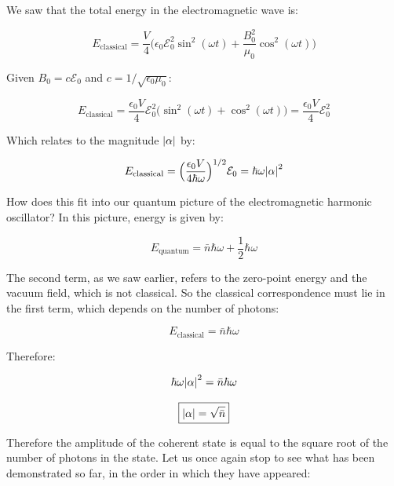 \documentclass[12pt,a4paper]{report}
\begin{document}
We saw that the total energy in the electromagnetic wave is:

\begin{equation}
    E_{\text{classical}}=\frac{V}{4}\Bigg(\epsilon_0\mathcal{E}_0^2\sin^2(\omega t)+\frac{B_0^2}{\mu_0}\cos^2(\omega t)\Bigg)
\end{equation}

Given $B_0=c\mathcal{E}_0$ and $c=1/\sqrt{\epsilon_0\mu_0}$:

\begin{equation}
    E_{\text{classical}}=\frac{\epsilon_0V}{4}\mathcal{E}_0^2\Big(\sin^2(\omega t)+\cos^2(\omega t)\Big)=\frac{\epsilon_0V}{4}\mathcal{E}_0^2
\end{equation}

Which relates to the magnitude $\abs{\alpha}$ by:

\begin{equation}
    E_{\text{classical}}=\Big( \frac{\epsilon_0V}{4\hbar\omega} \Big)^{1/2}\mathcal{E}_0=\hbar\omega\abs{\alpha}^2
\end{equation}

How does this fit into our quantum picture of the electromagnetic harmonic oscillator? In this picture, energy is given by:

\begin{equation}
    E_{\text{quantum}}=\bar{n}\hbar\omega+\frac{1}{2}\hbar\omega
\end{equation}

The second term, as we saw earlier, refers to the zero-point energy and the vacuum field, which is not classical. So the classical correspondence must lie in the first term, which depends on the number of photons:

\begin{equation}
    E_{\text{classical}}=\bar{n}\hbar\omega
\end{equation}

Therefore:

\begin{equation}
    \hbar\omega\abs{\alpha}^2=\bar{n}\hbar\omega
\end{equation}

\begin{equation}
    \boxed{\abs{\alpha}=\sqrt{\bar{n}}}
\end{equation}

Therefore the amplitude of the coherent state is equal to the square root of the number of photons in the state. Let us once again stop to see what has been demonstrated so far, in the order in which they have appeared:
\end{document}
